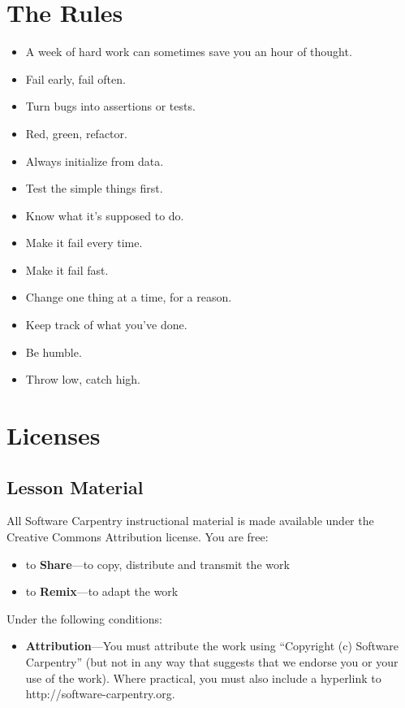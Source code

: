 \documentclass[]{book}
\begin{document}
\chapter{The Rules}\label{the-rules}

\begin{itemize}
\item
  A week of hard work can sometimes save you an hour of thought.
\item
  Fail early, fail often.
\item
  Turn bugs into assertions or tests.
\item
  Red, green, refactor.
\item
  Always initialize from data.
\item
  Test the simple things first.
\item
  Know what it's supposed to do.
\item
  Make it fail every time.
\item
  Make it fail fast.
\item
  Change one thing at a time, for a reason.
\item
  Keep track of what you've done.
\item
  Be humble.
\item
  Throw low, catch high.
\end{itemize}

\chapter{Licenses}\label{licenses}

\section{Lesson Material}

All Software Carpentry instructional material is made available under
the Creative Commons Attribution license. You are free:

\begin{itemize}
\item
  to \textbf{Share}---to copy, distribute and transmit the work
\item
  to \textbf{Remix}---to adapt the work
\end{itemize}

Under the following conditions:

\begin{itemize}
\item
  \textbf{Attribution}---You must attribute the work using ``Copyright
  (c) Software Carpentry'' (but not in any way that suggests that we
  endorse you or your use of the work). Where practical, you must also
  include a hyperlink to http://software-carpentry.org.
\end{itemize}
\end{document}
